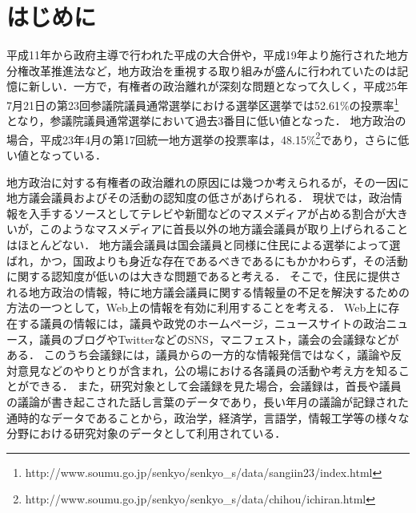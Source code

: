 \documentclass[japanese]{jnlp_1.4}
\begin{document}
\maketitle


\section{はじめに}

平成11年から政府主導で行われた平成の大合併や，平成19年より施行された地方分権改革推進法など，地方政治を重視する取り組みが盛んに行われていたのは記憶に新しい．一方で，有権者の政治離れが深刻な問題となって久しく，平成25年7月21日の第23回参議院議員通常選挙における選挙区選挙では52.61\%の投票率\footnote{http://www.soumu.go.jp/senkyo/senkyo\_s/data/sangiin23/index.html}となり，参議院議員通常選挙において過去3番目に低い値となった．
地方政治の場合，平成23年4月の第17回統一地方選挙の投票率は，48.15\%\footnote{http://www.soumu.go.jp/senkyo/senkyo\_s/data/chihou/ichiran.html}であり，さらに低い値となっている．

地方政治に対する有権者の政治離れの原因には幾つか考えられるが，その一因に地方議会議員およびその活動の認知度の低さがあげられる．
現状では，政治情報を入手するソースとしてテレビや新聞などのマスメディアが占める割合が大きいが，このようなマスメディアに首長以外の地方議会議員が取り上げられることはほとんどない．
地方議会議員は国会議員と同様に住民による選挙によって選ばれ，かつ，国政よりも身近な存在であるべきであるにもかかわらず，その活動に関する認知度が低いのは大きな問題であると考える．
そこで，住民に提供される地方政治の情報，特に地方議会議員に関する情報量の不足を解決するための方法の一つとして，Web上の情報を有効に利用することを考える．
Web上に存在する議員の情報には，議員や政党のホームページ，ニュースサイトの政治ニュース，議員のブログやTwitterなどのSNS，マニフェスト，議会の会議録などがある．
このうち会議録には，議員からの一方的な情報発信ではなく，議論や反対意見などのやりとりが含まれ，公の場における各議員の活動や考え方を知ることができる．
また，研究対象として会議録を見た場合，会議録は，首長や議員の議論が書き起こされた話し言葉のデータであり，長い年月の議論が記録された通時的なデータであることから，政治学，経済学，言語学，情報工学等の様々な分野における研究対象のデータとして利用されている．
\end{document}
